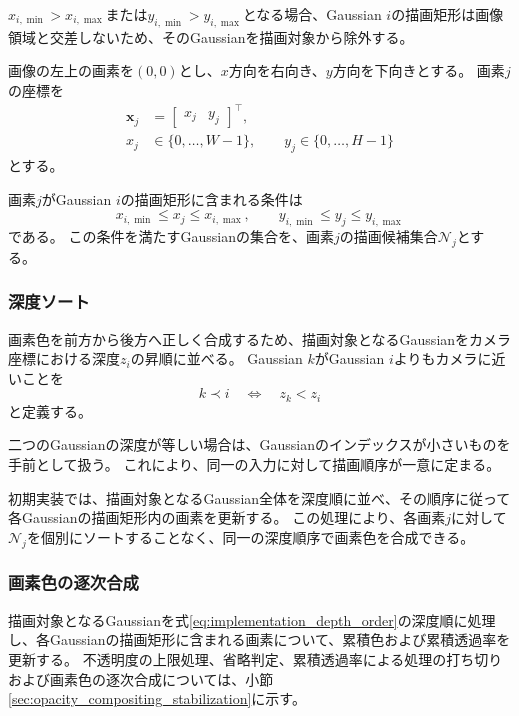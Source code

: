 \documentclass[dvipdfmx]{jlreq}
\begin{document}
$x_{i,\min}>x_{i,\max}$または$y_{i,\min}>y_{i,\max}$となる場合、Gaussian $i$の描画矩形は画像領域と交差しないため、そのGaussianを描画対象から除外する。

画像の左上の画素を$(0,0)$とし、$x$方向を右向き、$y$方向を下向きとする。
画素$j$の座標を
\begin{equation}
\begin{aligned}
    \bm{x}_j &= \begin{bmatrix} x_j & y_j \end{bmatrix}^{\top}, \\
    x_j &\in\{0,\ldots,W-1\}, \qquad y_j\in\{0,\ldots,H-1\}
\end{aligned}
\label{eq:pixel_coordinate_convention}
\end{equation}
とする。

画素$j$がGaussian $i$の描画矩形に含まれる条件は
\begin{equation}
    x_{i,\min} \leq x_j \leq x_{i,\max}, \qquad y_{i,\min} \leq y_j \leq y_{i,\max}
\end{equation}
である。
この条件を満たすGaussianの集合を、画素$j$の描画候補集合$\mathcal{N}_j$とする。

\subsubsection*{深度ソート}
画素色を前方から後方へ正しく合成するため、描画対象となるGaussianをカメラ座標における深度$z_i$の昇順に並べる。
Gaussian $k$がGaussian $i$よりもカメラに近いことを
\begin{equation}
    k\prec i \quad\Longleftrightarrow\quad z_k<z_i
    \label{eq:implementation_depth_order}
\end{equation}
と定義する。

二つのGaussianの深度が等しい場合は、Gaussianのインデックスが小さいものを手前として扱う。
これにより、同一の入力に対して描画順序が一意に定まる。

初期実装では、描画対象となるGaussian全体を深度順に並べ、その順序に従って各Gaussianの描画矩形内の画素を更新する。
この処理により、各画素$j$に対して$\mathcal{N}_j$を個別にソートすることなく、同一の深度順序で画素色を合成できる。

\subsubsection*{画素色の逐次合成}
描画対象となるGaussianを式\eqref{eq:implementation_depth_order}の深度順に処理し、各Gaussianの描画矩形に含まれる画素について、累積色および累積透過率を更新する。
不透明度の上限処理、省略判定、累積透過率による処理の打ち切りおよび画素色の逐次合成については、小節\ref{sec:opacity_compositing_stabilization}に示す。
\end{document}
